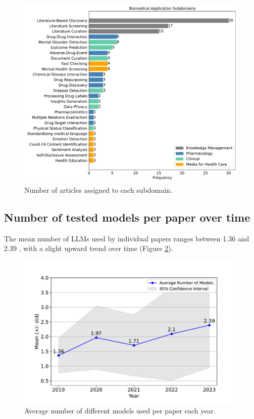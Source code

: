 \documentclass[fleqn,10pt]{olplainarticle}
\begin{document}
\begin{figure}[h]
\begin{center}
\includegraphics[scale=0.4]{visuals/new_pdf/number_of_papers_subdomain_count_2024.pdf} %
\caption{Number of articles assigned to each subdomain.}
\label{fig:nr_articles_per_subdomain}
\end{center}
\end{figure}

\subsection*{Number of tested models per paper over time}

The mean number of LLMs used by individual papers ranges between 1.36 and 2.39 , with a slight upward trend over time (Figure \ref{fig:LLM_avg_number_over_year}).

\begin{figure}[!ht]
\begin{center}
\includegraphics[scale=0.4]{visuals/new_pdf/LLM_number_per_paper_over_time_2024.pdf} %
\caption{Average number of different models used per paper each year.}
\label{fig:LLM_avg_number_over_year}
\end{center}
\end{figure}
\end{document}
